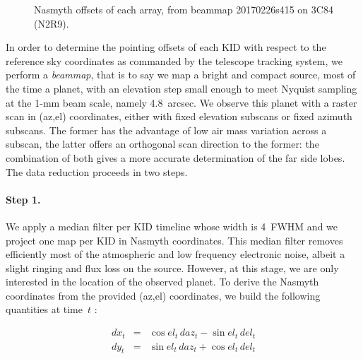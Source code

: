 \begin{figure}[p]
\begin{center}
\caption{Nasmyth offsets of each array, from beammap 20170226s415 on
  3C84 (N2R9).}
\label{fig:fov_ex}
\end{center}
\end{figure}


In order to determine the pointing offsets of each KID with respect to the reference sky
coordinates as commanded by the telescope tracking system, we perform a {\it beammap}, that is to say we map a bright and compact source, most of the time
a planet, with an elevation step small enough to meet Nyquist sampling at the 1-mm
beam scale, namely 4.8~arcsec. We observe this planet with a raster scan in
(az,el) coordinates, either with fixed elevation subscans or fixed azimuth
subscans. The former has the advantage of low air mass variation across a
subscan, the latter offers an orthogonal scan direction to the former: the
combination of both gives a more accurate determination of the far side
lobes. The data reduction proceeds in two steps.

\paragraph{Step 1.} We apply a median filter per
KID timeline whose width is 4~FWHM and we project one map per KID in Nasmyth
coordinates. This median filter removes efficiently most of the atmospheric and low frequency
electronic noise, albeit a slight ringing and flux loss on the
source. However, at this stage, we are only interested in the location of the
observed planet. To derive the Nasmyth coordinates from the provided (az,el)
coordinates, we build the following quantities at time~$t$ :

\begin{eqnarray}
dx_t &=& \cos el_t\, daz_t - \sin el_t\, del_t \nonumber \\
dy_t &=& \sin el_t\, daz_t + \cos el_t\, del_t \nonumber
\end{eqnarray}

